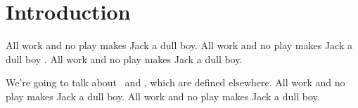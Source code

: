 
%
%

%
%

\section{Introduction}
\label{sec:introduction}

All work and no play makes Jack a dull boy.
All work and no play makes Jack a dull boy
\cite{knuth-website}
\cite{knuth-fundamental-algorithms}
\cite{dirac-quantum-mechanics}.
All work and no play makes Jack a dull boy.

We're going to talk about \varA\ and \varB, which are defined elsewhere.
All work and no play makes Jack a dull boy.
All work and no play makes Jack a dull boy.
